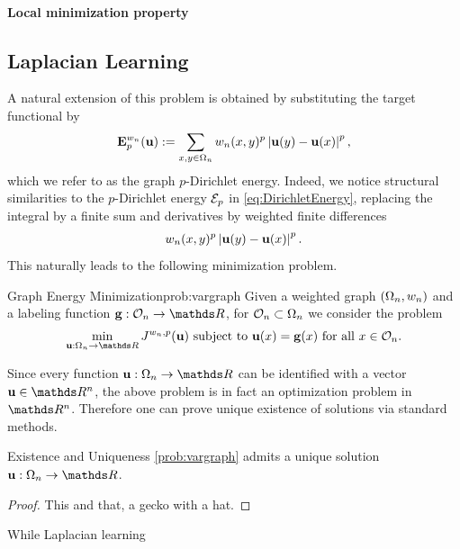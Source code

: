 \paragraph*{Local minimization property}
%
%
\subsection{Laplacian Learning}\label{sec:GpLap}

%
A natural extension of this problem is obtained by substituting the target functional by
%
\begin{align*}
\mathbf{E}^{w_n}_p(\mathbf{u}):= \sum_{x,y\in\Omega_n} w_n(x,y)^p \left|\mathbf{u}(y) - \mathbf{u}(x)\right|^p,
\end{align*}
%
which we refer to as the graph $p$-Dirichlet energy. Indeed, we notice structural 
similarities to the $p$-Dirichlet energy $\mathcal{E}_p$ in \cref{eq:DirichletEnergy}, replacing the integral by a finite 
sum and derivatives by weighted finite differences
%
\begin{align*}
 w_n(x,y)^p \left|\mathbf{u}(y) - \mathbf{u}(x)\right|^p.
\end{align*}
%
This naturally leads to the following minimization problem.
%
\begin{problem}{Graph Energy Minimization}{prob:vargraph}
Given a weighted graph $(\Omega_n, w_n)$ and a labeling function $\vec g:\conset_n\to\R$, for $\mathcal{O}_n\subset\Omega_n$ we consider 
the problem
%
\begin{align*}
\min_{\vec u:\domain_n\to\R} J^{w_n,p}(\vec u) \text{ subject to } \vec u(x) = \vec g(x) \text{ for all } x\in\conset_n.
\end{align*}
\end{problem}
%
\noindent%
Since every function $\vec u:\domain_n\to\R$ can be identified with a vector $\vec u\in\R^n$, the above problem 
is in fact an optimization problem in $\R^n$. Therefore one can prove unique existence of solutions via standard methods.
%
\begin{theorem}{Existence and Uniqueness}{}
\cref{prob:vargraph} admits a unique solution $\vec u:\domain_n\to\R$.
\end{theorem}
%
\begin{proof}
This and that, a gecko with a hat.
\end{proof}
%
While Laplacian learning 

